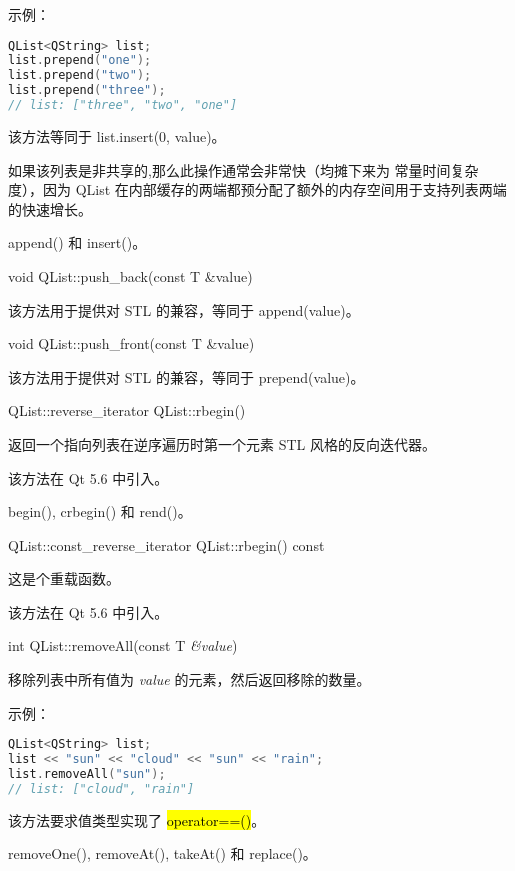 示例：


\begin{lstlisting}[language=C++]
QList<QString> list;
list.prepend("one");
list.prepend("two");
list.prepend("three");
// list: ["three", "two", "one"]
\end{lstlisting}


该方法等同于 list.insert(0, value)。

如果该列表是非共享的,那么此操作通常会非常快（均摊下来为 常量时间复杂度），因为 QList 在内部缓存的两端都预分配了额外的内存空间用于支持列表两端的快速增长。


\begin{seeAlso}
append() 和 insert()。
\end{seeAlso}

void QList::push\_back(const T \&value)

该方法用于提供对 STL 的兼容，等同于 append(value)。

void QList::push\_front(const T \&value)

该方法用于提供对 STL 的兼容，等同于 prepend(value)。

QList::reverse\_iterator QList::rbegin()

返回一个指向列表在逆序遍历时第一个元素 STL 风格的反向迭代器。

该方法在 Qt 5.6 中引入。

\begin{seeAlso}
begin(), crbegin() 和 rend()。
\end{seeAlso}

QList::const\_reverse\_iterator QList::rbegin() const

这是个重载函数。

该方法在 Qt 5.6 中引入。

int QList::removeAll(const T \emph{\&value})

移除列表中所有值为 \emph{value} 的元素，然后返回移除的数量。

示例：

\begin{lstlisting}[language=C++]
QList<QString> list;
list << "sun" << "cloud" << "sun" << "rain";
list.removeAll("sun");
// list: ["cloud", "rain"]
\end{lstlisting}

该方法要求值类型实现了 \hl{operator==()}。

\begin{seeAlso}
removeOne(), removeAt(), takeAt() 和 replace()。
\end{seeAlso}

